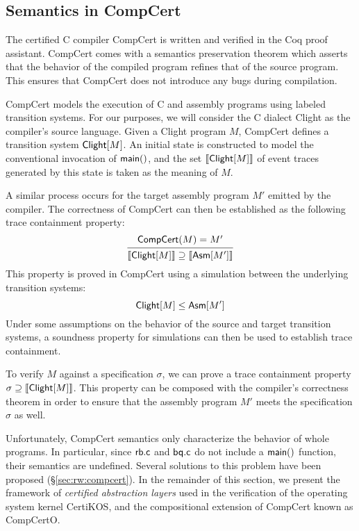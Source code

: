 \documentclass[acmsmall,review,anonymous]{acmart}\settopmatter{printfolios=true,printccs=false,printacmref=false}
\begin{document}
\subsection{Semantics in CompCert} %

The certified C compiler CompCert \cite{compcert} is
written and verified in the Coq proof assistant.
CompCert comes with a semantics preservation theorem
which asserts that
the behavior of the compiled program
refines that of the source program.
This ensures that CompCert does not introduce any bugs
during compilation.

CompCert
models the execution of C and assembly programs
using labeled transition systems.
For our purposes,
we will consider the C dialect Clight
as the compiler's source language.
Given a Clight program $M$,
CompCert defines a transition system $ \mathsf{Clight} [M]$.
An initial state is constructed
to model the conventional invocation of $ \mathsf{main} ()$,
and the set $\llbracket  \mathsf{Clight} [M] \rrbracket$ of
event traces generated by this state
is taken as the meaning of $M$.

A similar process occurs for the target assembly program $M'$
emitted by the compiler.
The correctness of CompCert can then be established
as the following trace containment property:
\[
  \begin{prooftree}
    \hypo{\kw{CompCert}(M) = M'}
    \infer1{\llbracket \kw{Clight}[M] \rrbracket \supseteq
            \llbracket \kw{Asm}[M'] \rrbracket}
  \end{prooftree}
\]
This property is proved in CompCert
using a simulation between the underlying transition systems:
\[
   \mathsf{Clight} [M] \le  \mathsf{Asm} [M']
\]
Under some assumptions
on the behavior of the source and target transition systems,
a soundness property for simulations
can then be used to establish trace containment.

To verify $M$ against a specification $\sigma$,
we can prove a trace containment property
$\sigma \supseteq \llbracket  \mathsf{Clight} [M] \rrbracket$.
This property can be composed with
the compiler's correctness theorem
in order to ensure that the assembly program $M'$
meets the specification $\sigma$ as well.

Unfortunately,
CompCert semantics only characterize the behavior of whole programs.
In particular,
since $ \mathsf{rb.c} $ and $ \mathsf{bq.c} $ do not include a $ \mathsf{main} ()$ function,
their semantics are undefined.
Several solutions to this problem have been proposed (\S\ref{sec:rw:compcert}).
In the remainder of this section,
we present the framework of \emph{certified abstraction layers}
used in the verification of the operating system kernel CertiKOS,
and the compositional extension of CompCert known as CompCertO.
\end{document}
